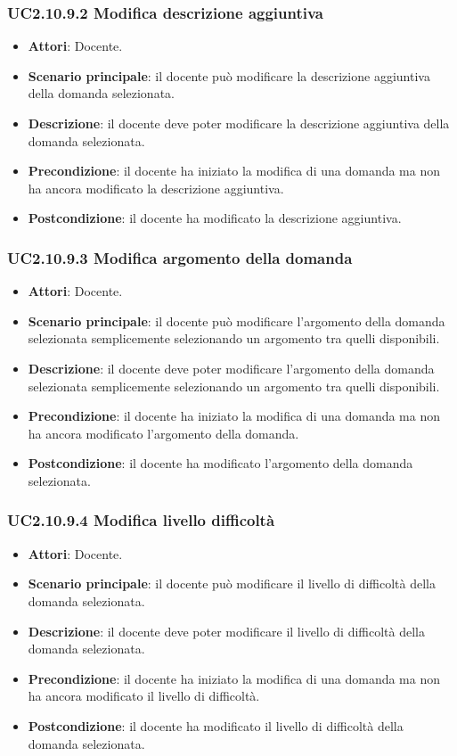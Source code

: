\subsubsection{UC2.10.9.2 Modifica descrizione aggiuntiva}
\begin{itemize}
\item \textbf{Attori}: Docente.
\item \textbf{Scenario principale}: il docente può modificare la descrizione aggiuntiva della domanda selezionata.
\item \textbf{Descrizione}: il docente deve poter modificare la descrizione aggiuntiva della domanda selezionata.
\item \textbf{Precondizione}: il docente ha iniziato la modifica di una domanda ma non ha ancora modificato la descrizione aggiuntiva.
\item \textbf{Postcondizione}: il docente ha modificato la descrizione aggiuntiva.
\end{itemize}
\subsubsection{UC2.10.9.3 Modifica argomento della domanda}
\begin{itemize}
\item \textbf{Attori}: Docente.
\item \textbf{Scenario principale}: il docente può modificare l'argomento della domanda selezionata semplicemente selezionando un argomento tra quelli disponibili.
\item \textbf{Descrizione}: il docente deve poter modificare l'argomento della domanda selezionata semplicemente selezionando un argomento tra quelli disponibili.
\item \textbf{Precondizione}: il docente ha iniziato la modifica di una domanda ma non ha ancora modificato l'argomento della domanda.
\item \textbf{Postcondizione}: il docente ha modificato l'argomento della domanda selezionata.
\end{itemize}
\subsubsection{UC2.10.9.4 Modifica livello difficoltà}
\begin{itemize}
\item \textbf{Attori}: Docente.
\item \textbf{Scenario principale}: il docente può modificare il livello di difficoltà della domanda selezionata.
\item \textbf{Descrizione}: il docente deve poter modificare il livello di difficoltà della domanda selezionata.
\item \textbf{Precondizione}: il docente ha iniziato la modifica di una domanda ma non ha ancora modificato il livello di difficoltà.
\item \textbf{Postcondizione}: il docente ha modificato il livello di difficoltà della domanda selezionata.
\end{itemize}
